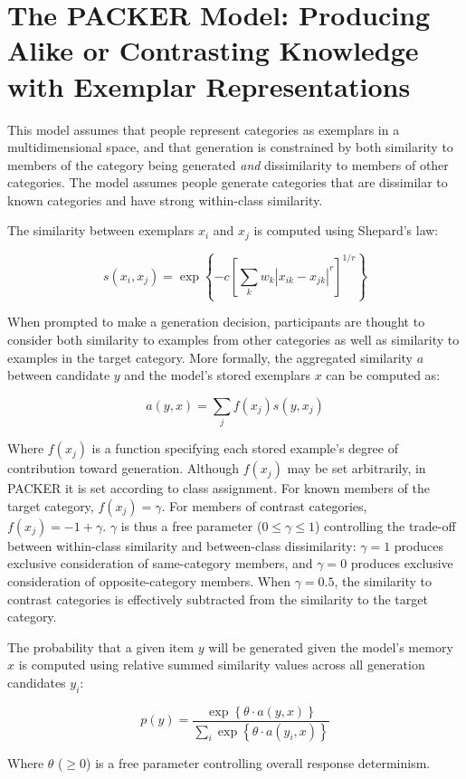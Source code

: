 \documentclass[12pt]{article}
\begin{document}
\section{The PACKER Model: Producing Alike or Contrasting Knowledge with Exemplar Representations}


This model assumes that people represent categories as exemplars in a multidimensional space, and that generation is constrained by both similarity to members of the category being generated \textit{and} dissimilarity to members of other categories. The model assumes people generate categories that are dissimilar to known categories and have strong within-class similarity.

The similarity between exemplars $x_i$ and $x_j$ is computed using Shepard's law:

\begin{equation}
s\left(x_i,x_j\right) = \exp \left\{ -c \left[\sum_{k}{ w_k \left| x_{ik} - x_{jk} \right|^r }\right]^{1/r} \right\}
\label{eq:similarity}
\end{equation}

When prompted to make a generation decision, participants are thought to consider both similarity to examples from other categories as well as similarity to examples in the target category. More formally, the aggregated similarity $a$ between candidate $y$ and the model's stored exemplars $x$ can be computed as:

\begin{equation}
  a(y, x) = \sum_j{f(x_j) s(y, x_j)}
\end{equation}

Where $f(x_j)$ is a function specifying each stored example's degree of contribution toward generation. Although $f(x_j)$ may be set arbitrarily, in PACKER it is set according to class assignment. For known members of the target category, $f(x_j) = \gamma$. For members of contrast categories, $f(x_j) = -1 + \gamma$. $\gamma$ is thus a free parameter ($0 \leq \gamma \leq 1$) controlling the trade-off between within-class similarity and between-class dissimilarity: $\gamma = 1$ produces exclusive consideration of same-category members, and $\gamma = 0$ produces exclusive consideration of opposite-category members. When $\gamma = 0.5$, the similarity to contrast categories is effectively subtracted from the similarity to the target category.

The probability that a given item $y$ will be generated given the model's memory $x$ is computed using relative summed similarity values across all generation candidates $y_i$:

\begin{equation}
p(y) = \dfrac
{ \exp  \left \{ \theta \cdot a \left( y, x \right) \right \} } 
{ \sum_i{ \exp  \left \{ \theta \cdot a \left( y_i, x \right) \right\}  } }
\label{eq:packer-choice}
\end{equation}

Where $\theta$ ($\geq 0$) is a free parameter controlling overall response determinism.
\end{document}
